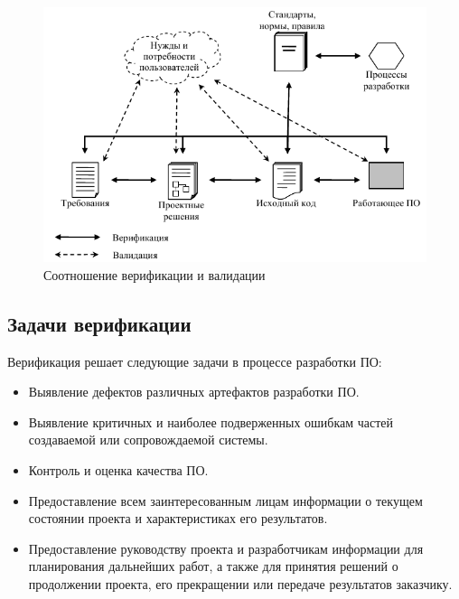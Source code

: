 \begin{figure}[h!]
    \begin{center}
        \includegraphics[width=\textwidth]{img/validation_and_verification.png}
    \end{center}
    \caption{Соотношение верификации и валидации}
    \label{fig:figure2}
\end{figure}

\subsection{Задачи верификации} %

Верификация решает следующие задачи в процессе разработки ПО:

\begin{itemize}
    \item Выявление дефектов различных артефактов разработки ПО.
    \item Выявление критичных и наиболее подверженных ошибкам частей
    создаваемой или сопровождаемой системы.
    \item Контроль и оценка качества ПО.
    \item Предоставление всем заинтересованным лицам информации о текущем
    состоянии проекта и характеристиках его результатов.
    \item Предоставление руководству проекта и разработчикам информации
    для планирования дальнейших работ, а также для принятия решений о
    продолжении проекта, его прекращении или передаче результатов заказчику.
\end{itemize}
